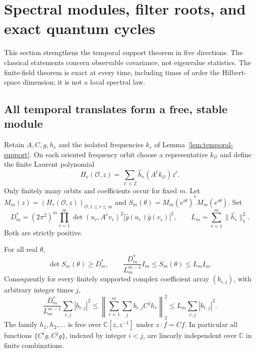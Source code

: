 \section{Spectral modules, filter roots, and exact quantum cycles}
\label{sec:spectral-modules}
This section strengthens the temporal support theorem in five directions.
The classical statements concern observable covariance, not eigenvalue
statistics. The finite-field theorem is exact at every time, including times
of order the Hilbert-space dimension; it is not a local spectral law.

\subsection{All temporal translates form a free, stable module}
Retain $A,C,g,h_r$ and the isolated frequencies $k_r$ of
Lemma~\ref{lem:temporal-support}. On each oriented frequency orbit choose a
representative $k_{\mathcal O}$ and define the finite Laurent polynomial
\[
 H_r(\mathcal O,z)=\sum_{\ell\in\mathbb Z}
       \widehat h_r(A^\ell k_{\mathcal O})z^\ell .
\]
Only finitely many orbits and coefficients occur for fixed $m$. Let
$M_m(z)=(H_r(\mathcal O,z))_{\mathcal O,1\le r\le m}$ and
$S_m(\theta)=M_m(e^{i\theta})^*M_m(e^{i\theta})$.
Set
\[
 D_m^*=(2\pi^2)^m\prod_{r=1}^m
  \det(u_r,A^rv_r)^2|\widehat g(u_r)\widehat g(v_r)|^2,
 \qquad L_m=\sum_{r=1}^m\|\widehat h_r\|_1^2.
\]
Both are strictly positive.
\begin{theorem}
\label{thm:module-riesz}
For all real $\theta$,
\[
 \det S_m(\theta)\ge D_m^*,\qquad
 \frac{D_m^*}{L_m^{m-1}}I_m\le S_m(\theta)\le L_m I_m.
\]
Consequently for every finitely supported complex coefficient array
$(b_{r,j})$, with arbitrary integer times $j$,
\begin{equation}\label{eq:module-riesz}
 \frac{D_m^*}{L_m^{m-1}}\sum_{r,j}|b_{r,j}|^2
 \le\left\|\sum_{r=1}^m\sum_j b_{r,j}C^jh_r\right\|_2^2
 \le L_m\sum_{r,j}|b_{r,j}|^2.
\end{equation}
The family $h_1,h_2,\ldots$ is free over $\mathbb C[z,z^{-1}]$ under
$z\cdot f=Cf$. In particular all functions
$\{C^ig,C^jg\}$, indexed by integer $i<j$, are linearly independent over
$\mathbb C$ in finite combinations.
\end{theorem}
